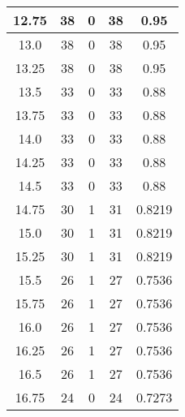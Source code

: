 \documentclass[letterpaper, 12pt]{article}
\begin{document}
\begin{longtable}{|c|c|c|c|c|}
\hline
12.75 & 38 & 0 & 38 & 0.95 \\
\hline
13.0 & 38 & 0 & 38 & 0.95 \\
\hline
13.25 & 38 & 0 & 38 & 0.95 \\
\hline
13.5 & 33 & 0 & 33 & 0.88 \\
\hline
13.75 & 33 & 0 & 33 & 0.88 \\
\hline
14.0 & 33 & 0 & 33 & 0.88 \\
\hline
14.25 & 33 & 0 & 33 & 0.88 \\
\hline
14.5 & 33 & 0 & 33 & 0.88 \\
\hline
14.75 & 30 & 1 & 31 & 0.8219 \\
\hline
15.0 & 30 & 1 & 31 & 0.8219 \\
\hline
15.25 & 30 & 1 & 31 & 0.8219 \\
\hline
15.5 & 26 & 1 & 27 & 0.7536 \\
\hline
15.75 & 26 & 1 & 27 & 0.7536 \\
\hline
16.0 & 26 & 1 & 27 & 0.7536 \\
\hline
16.25 & 26 & 1 & 27 & 0.7536 \\
\hline
16.5 & 26 & 1 & 27 & 0.7536 \\
\hline
16.75 & 24 & 0 & 24 & 0.7273 \\
\hline
\end{longtable}
\end{document}
